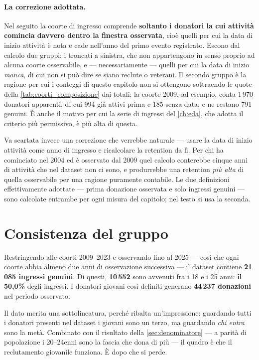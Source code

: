 \paragraph{La correzione adottata.}
Nel seguito la coorte di ingresso comprende \textbf{soltanto i donatori la cui
attività comincia davvero dentro la finestra osservata}, cioè quelli per cui la
data di inizio attività è nota e cade nell'anno del primo evento registrato.
Escono dal calcolo due gruppi: i troncati a sinistra, che non appartengono in
senso proprio ad alcuna coorte osservabile, e --- necessariamente --- quelli
per cui la data di inizio \emph{manca}, di cui non si può dire se siano
reclute o veterani. Il secondo gruppo è la ragione per cui i conteggi di questo
capitolo non si ottengono sottraendo le quote della
\cref{tab:coorti_composizione} dai totali: la coorte 2009, ad esempio, conta
1\,970 donatori apparenti, di cui 994 già attivi prima e 185 senza data, e ne
restano 791 genuini. È anche il motivo per cui la serie di ingressi del
\cref{ch:eda}, che adotta il criterio più permissivo, è più alta di questa.

Va scartata invece una correzione che verrebbe naturale --- usare la data di
inizio attività come anno di ingresso e ricalcolare la retention da lì. Per chi
ha cominciato nel 2004 ed è osservato dal 2009 quel calcolo conterebbe cinque
anni di attività che nel dataset non ci sono, e produrrebbe una retention
\emph{più alta} di quella osservabile per una ragione puramente contabile. Le
due definizioni effettivamente adottate --- prima donazione osservata e solo
ingressi genuini --- sono calcolate entrambe per ogni misura del capitolo; 
nel testo si usa la seconda.

\section{Consistenza del gruppo}
\label{sec:ret_ident}

Restringendo alle coorti 2009--2023 e osservando fino al 2025 --- così che
ogni coorte abbia almeno due anni di osservazione successiva --- il dataset
contiene \textbf{21\,085 ingressi genuini}. Di questi, \textbf{10\,552} sono
avvenuti fra i 18 e i 25 anni: \textbf{il 50{,}0\%} degli ingressi. I donatori
giovani così definiti generano \textbf{44\,237 donazioni} nel periodo osservato.

Il dato merita una sottolineatura, perché ribalta un'impressione: guardando
tutti i donatori presenti nel dataset i giovani sono un terzo, ma guardando
\emph{chi entra} sono la metà. Combinato con il risultato della
\cref{sec:denominatore} --- a parità di popolazione i 20--24enni sono la fascia
che dona di più --- il quadro è che il reclutamento giovanile funziona. È dopo
che si perde.

